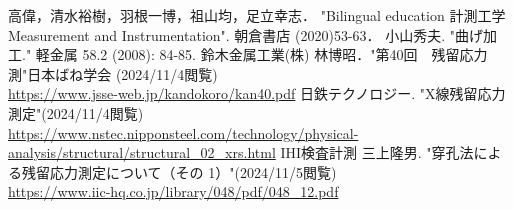 \begin{thebibliography}{99}
     高偉，清水裕樹，羽根一博，祖山均，足立幸志． "Bilingual education 計測工学 Measurement and Instrumentation". 朝倉書店 (2020)53-63．
     小山秀夫. "曲げ加工." 軽金属 58.2 (2008): 84-85.
     鈴木金属工業(株) 林博昭．"第40回　残留応力測"日本ばね学会 (2024/11/4閲覧)\\
    \url{https://www.jsse-web.jp/kandokoro/kan40.pdf}
    日鉄テクノロジー.
    "X線残留応力測定"(2024/11/4閲覧)\\
    \url{https://www.nstec.nipponsteel.com/technology/physical-analysis/structural/structural_02_xrs.html}
     IHI検査計測 三上隆男. "穿孔法による残留応力測定について（その 1）"(2024/11/5閲覧)\\
    \url{https://www.iic-hq.co.jp/library/048/pdf/048_12.pdf}
\end{thebibliography}

